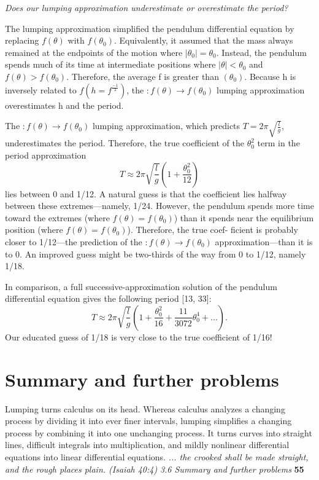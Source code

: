 \documentclass[a4paper, 11pt]{book}
\begin{document}
    \textit{Does our lumping approximation underestimate or overestimate the period?}

    The lumping approximation simplified the pendulum differential equation
    by replacing $f(\theta)$ with $f(\theta_{0})$. Equivalently, it assumed that the mass
    always remained at the endpoints of the motion where $|\theta_{0}| = \theta_{0}$. Instead,
    the pendulum spends much of its time at intermediate positions where
    $|\theta| < \theta_{0}$ and $f(\theta) > f(\theta_{0})$. Therefore, the average f is greater than $(\theta_{0})$.
    Because h is inversely related to $f (h = f^\frac{-1}{2})$, the $\colon f(\theta) \to f(\theta_{0})$ lumping
    approximation overestimates h and the period.

    The $\colon f(\theta) \to f(\theta_{0})$ lumping approximation, which predicts $T= 2\pi\sqrt{\frac{l}{g}}$,
    underestimates the period. Therefore, the true coefficient of the $\theta_{0}^2$
    term
    in the period approximation
    \begin{equation}T\approx 2\pi\sqrt{\frac{l}{g}}\left(1+\frac{\theta_{0}^2}{12}\right)\end{equation}
    lies between 0 and 1/12. A natural guess is that the coefficient lies halfway
    between these extremes—namely, 1/24. However, the pendulum spends
    more time toward the extremes (where $f(\theta) = f(\theta_{0})$) than it spends near
    the equilibrium position (where $f(\theta)=f(\theta_{0})$). Therefore, the true coef-
    ficient is probably closer to 1/12—the prediction of the $\colon f(\theta) \to f(\theta_{0})$
    approximation—than it is to 0. An
    improved guess might be two-thirds
    of the way from 0 to 1/12, namely 1/18.

    In comparison, a full successive-approximation solution of the pendulum
    differential equation gives the following period [13, 33]:
    \begin{equation}T\approx 2\pi\sqrt{\frac{l}{g}}\left(1+\frac{\theta_{0}^2}{16}+\frac{11}{3072}\theta_{0}^4+...\right).\end{equation}
    Our educated guess of 1/18 is very close to the true coefficient of 1/16!

    \noindent
    \section[toc]{Summary and further problems}
    Lumping turns calculus on its head. Whereas calculus analyzes a changing
    process by dividing it into ever finer intervals, lumping simplifies a
    changing process by combining it into one unchanging process. It turns
    curves into straight lines, difficult integrals into multiplication, and mildly
    nonlinear differential equations into linear differential equations.
    \normalsize \textit{... the crooked shall be made straight, and the rough places plain. (Isaiah 40:4)}
    \newpage
    \noindent
    \large\textit{3.6 Summary and further problems} \hfill \textbf{55} \\
\end{document}
